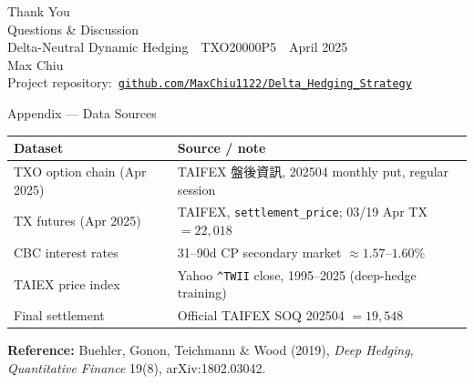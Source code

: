 \documentclass[aspectratio=169,t]{beamer}
\begin{document}
\begin{frame}
  \centering
  \vspace{1.4cm}
  {\Huge\textcolor{primary}{Thank You}}\\[0.6em]
  {\large Questions \& Discussion}\\[1.4em]
  {\small Delta-Neutral Dynamic Hedging \,\textbar\, TXO20000P5 \,\textbar\, April 2025}\\[0.3em]
  {\small Max Chiu}\\[0.4em]
  {\small Project repository:\ \href{https://github.com/MaxChiu1122/Delta_Hedging_Strategy}{\texttt{github.com/MaxChiu1122/Delta\_Hedging\_Strategy}}}
\end{frame}

\appendix
\begin{frame}[noframenumbering]{Appendix --- Data Sources}
  \small
  \begin{tabular}{ll}
    \toprule
    \textbf{Dataset} & \textbf{Source / note} \\
    \midrule
    TXO option chain (Apr 2025) & TAIFEX 盤後資訊, 202504 monthly put, regular session \\
    TX futures (Apr 2025) & TAIFEX, \texttt{settlement\_price}; 03/19 Apr TX $=22{,}018$ \\
    CBC interest rates & 31--90d CP secondary market $\approx 1.57$--$1.60\%$ \\
    TAIEX price index & Yahoo \texttt{\^{}TWII} close, 1995--2025 (deep-hedge training) \\
    Final settlement & Official TAIFEX SOQ 202504 $=19{,}548$ \\
    \bottomrule
  \end{tabular}
  \vspace{0.8em}

  \textbf{Reference:} Buehler, Gonon, Teichmann \& Wood (2019), \emph{Deep Hedging}, \emph{Quantitative Finance} 19(8), arXiv:1802.03042.
\end{frame}
\end{document}
